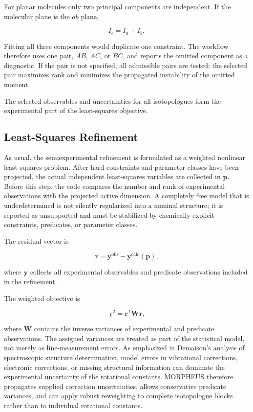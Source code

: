 \documentclass[aip,jcp,reprint,longbibliography,floatfix]{revtex4-2}
\begin{document}
For planar molecules only two principal components are independent. If the
molecular plane is the $ab$ plane,

\begin{equation}
I_c = I_a + I_b ,
\end{equation}

Fitting all three components would duplicate one constraint. The workflow
therefore uses one pair, $AB$, $AC$, or $BC$, and reports the omitted component
as a diagnostic. If the pair is not specified, all admissible pairs are tested;
the selected pair maximizes rank and minimizes the propagated instability of
the omitted moment.

The selected observables and uncertainties for all isotopologues form the
experimental part of the least-squares objective.


\subsection{Least-Squares Refinement}

As usual,\cite{Demaison2007EquilibriumReview,Demaison2011EquilibriumStructures,Mendolicchio2017MSR}
the semiexperimental refinement is formulated as a weighted nonlinear
least-squares problem.
After hard constraints and parameter classes have been projected, the actual independent
least-squares variables are collected in $\mathbf{p}$.
Before this step, the code compares the number and rank of experimental
observations with the projected active dimension. A completely free model that
is underdetermined is not silently regularized into a nominal structure; it is
reported as unsupported and must be stabilized by chemically explicit
constraints, predicates, or parameter classes.

The residual vector is

\begin{equation}
\mathbf{r}
= \mathbf{y}^{\mathrm{obs}}
- \mathbf{y}^{\mathrm{calc}}(\mathbf{p}),
\end{equation}

where $\mathbf{y}$ collects all experimental observables and predicate
observations included in the refinement.

The weighted objective is

\begin{equation}
\chi^2
=
\mathbf{r}^{T}
\mathbf{W}
\mathbf{r},
\end{equation}

where $\mathbf{W}$ contains the inverse variances of experimental and predicate
observations. The assigned variances are treated as part of the statistical
model, not merely as line-measurement errors. As emphasized in Demaison's
analysis of spectroscopic structure determination,\cite{Demaison2007EquilibriumReview}
model errors in vibrational corrections, electronic corrections, or missing
structural information can dominate the experimental uncertainty of the
rotational constants. MORPHEUS therefore propagates supplied correction
uncertainties, allows conservative predicate variances, and can apply robust
reweighting to complete isotopologue blocks rather than to individual
rotational constants.
\end{document}
